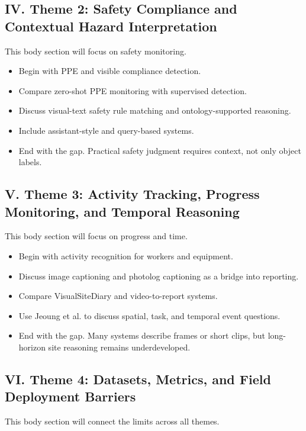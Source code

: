 \documentclass[10pt, letterpaper]{article}
\begin{document}
\subsection{IV. Theme 2: Safety Compliance and Contextual Hazard Interpretation}

This body section will focus on safety monitoring.

\begin{itemize}
\item Begin with PPE and visible compliance detection.
\item Compare zero-shot PPE monitoring with supervised detection.
\item Discuss visual-text safety rule matching and ontology-supported reasoning.
\item Include assistant-style and query-based systems.
\item End with the gap. Practical safety judgment requires context, not only object labels.
\end{itemize}

\subsection{V. Theme 3: Activity Tracking, Progress Monitoring, and Temporal Reasoning}

This body section will focus on progress and time.

\begin{itemize}
\item Begin with activity recognition for workers and equipment.
\item Discuss image captioning and photolog captioning as a bridge into reporting.
\item Compare VisualSiteDiary and video-to-report systems.
\item Use Jeoung et al. to discuss spatial, task, and temporal event questions.
\item End with the gap. Many systems describe frames or short clips, but long-horizon site reasoning remains underdeveloped.
\end{itemize}

\subsection{VI. Theme 4: Datasets, Metrics, and Field Deployment Barriers}

This body section will connect the limits across all themes.
\end{document}
